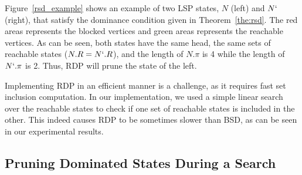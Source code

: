 \documentclass[letterpaper]{article} %
\newcommand\AF[1]{\nb{\textbf{Ariel:}}{red}{#1}}
\newcommand\Yossi[1]{\nb{\textbf{Yossi:}}{green}{#1}}
\newcommand\Roni[1]{\nb{\textbf{Roni:}}{blue}{#1}}
\begin{document}
Figure~\ref{rsd_example} shows an example of two LSP states, $N$ (left) and $N`$ (right), that satisfy the dominance condition given in Theorem~\ref{the:rsd}. 
The red areas represents the blocked vertices and green areas represents the reachable vertices. 
As can be seen, both states have the same head, 
the same sets of reachable states ($N.R=N`.R$), 
and the length of $N.\pi$ is 4 while the length of $N`.\pi$ is 2. Thus, RDP will prune the state of the left. 



Implementing RDP in an efficient manner is a challenge, as it requires fast set inclusion computation. In our implementation, we used a simple linear search over the reachable states to check if one set of reachable states is included in the other. This indeed causes RDP to be sometimes slower than BSD, as can be seen in our experimental results. 



\subsection{Pruning Dominated States During a Search}
\end{document}
